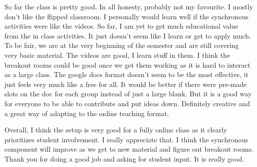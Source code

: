 \documentclass[11pt]{article}
\begin{document}
So far the class is pretty good. In all honesty,  probably not my favourite. I mostly don't like the flipped classroom. I personally would learn well if the synchronous activities were like the videos. So far, I am yet to get much educational value from the in class activities. It just doesn't seem like I learn or get to apply much. To be fair, we are at the very beginning of the semester and are still covering very basic material. The videos are good, I learn stuff in them. I think the breakout rooms could be good once we get them working as it is hard to interact as a large class. The google docs format doesn't seem to be the most effective, it just feels very much like a free for all. It would be better if there were pre-made slots on the doc for each group instead of just a large blank. But it is a good way for everyone to be able to contribute and put ideas down. Definitely creative and a great way of adapting to the online teaching format. 

Overall, I think the setup is very good for a fully online class as it clearly prioritizes student involvement. I really appreciate that. I think the synchronous component will improve as we get to new material and figure out breakout rooms. Thank you for doing a good job and asking for student input. It is really good. 
\end{document}
